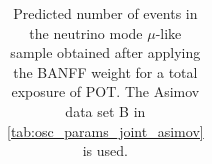 \begin{table}
\begin{tabular} { | l ||r | r | r | r | r | r | | r | }
\end{tabular}
\caption{
Predicted number of events in the neutrino mode $\mu$-like sample
obtained after applying the BANFF weight
for a total exposure of \TotalPotNuRunOneSevenC{} POT.
The Asimov data set B in \cref{tab:osc_params_joint_asimov} is used.
}
\label{tab:events_1rmu_Asimov_B_Run17c}
\end{table}


